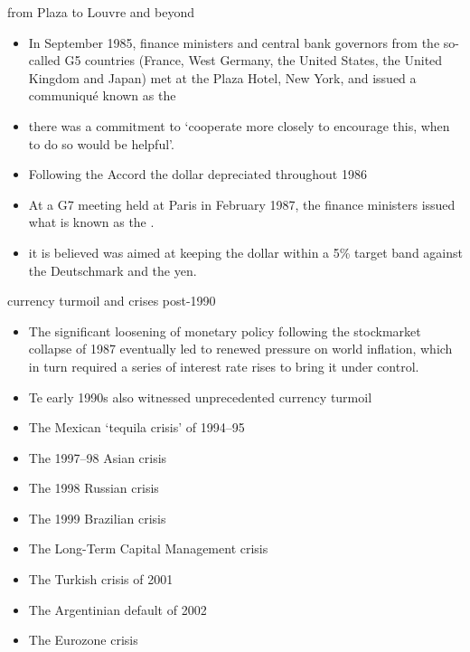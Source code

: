 \documentclass[10pt,hyperref={CJKbookmarks=true},xcolor=dvipsnames,aspectratio=169]{beamer}
\begin{document}
\begin{frame}{from Plaza to Louvre and beyond}
	\begin{itemize}
		\item In September 1985, finance ministers and central bank governors from the so-called
		G5 countries (France, West Germany, the United States, the United Kingdom and Japan) met at the Plaza Hotel, New York, and issued a communiqué known as the 
		\item  there was a commitment to ‘cooperate more closely to encourage this, when to do so would be helpful’.
		\item  Following the Accord the dollar depreciated throughout 1986
		\item At a G7 meeting held at Paris in February 1987, the finance ministers issued what		is known as the .
		\item  it is believed was aimed at
		keeping the dollar within a 5\% target band against the Deutschmark and the yen.
	\end{itemize}
\end{frame}

\begin{frame}{currency turmoil and crises post-1990}

	\begin{itemize}
		\item The significant loosening of monetary policy following the stockmarket collapse of
		1987 eventually led to renewed pressure on world inflation, which in turn required a
		series of interest rate rises to bring it under control. 
		\item Te early 1990s also witnessed
		unprecedented currency turmoil
		\item The Mexican ‘tequila crisis’ of 1994–95
		\item The 1997–98 Asian crisis
		\item The 1998 Russian crisis
		\item The 1999 Brazilian crisis
		\item The Long-Term Capital Management crisis
		\item The Turkish crisis of 2001
		\item The Argentinian default of 2002
		\item The Eurozone crisis
	\end{itemize}
\end{frame}
\end{document}
